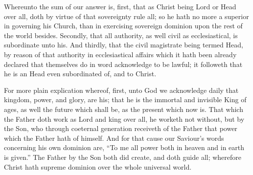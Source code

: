 Whereunto the sum of our answer is, first, that as Christ being Lord or Head over all, doth by virtue of that sovereignty rule all; so he hath no more a superior in governing his Church, than in exercising sovereign dominion upon the rest of the world besides. Secondly, that all authority, as well civil as ecclesiastical, is subordinate unto his. And thirdly, that the civil magistrate being termed Head, by reason of that authority in ecclesiastical affairs which it hath been already declared that themselves do in word acknowledge to be lawful; it followeth that he is an Head even subordinated of, and to Christ.

For more plain explication whereof, first, unto God we acknowledge daily that kingdom, power, and glory, are his; that he is the immortal and invisible King of ages, as well the future which shall be, as the present which now is. That which the Father doth work as Lord and king over all, he worketh not without, but by the Son, who through coeternal generation receiveth of the Father that power which the Father hath of himself. And for that cause our Saviour’s words concerning his own dominion are, “To me all power both in heaven and in earth is given.” The Father by the Son both did create, and doth guide all; wherefore Christ hath supreme dominion over the whole universal world.

